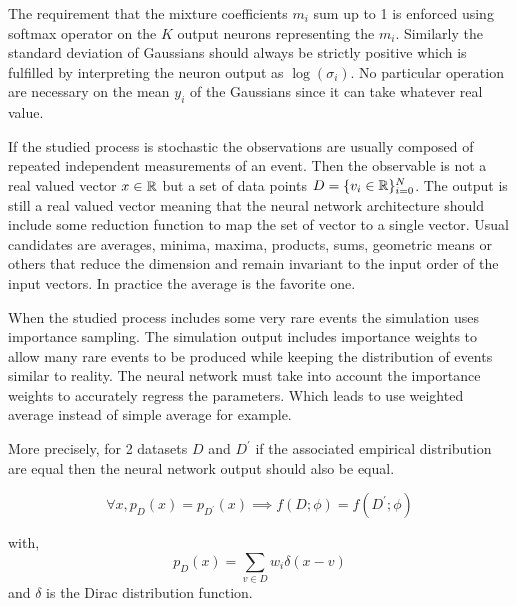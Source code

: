 The requirement that the mixture coefficients $m_i$ sum up to 1 is enforced using softmax operator on the $K$ output neurons representing the $m_i$.
Similarly the standard deviation of Gaussians should always be strictly positive which is fulfilled by interpreting the neuron output as $\log(\sigma_i)$.
No particular operation are necessary on the mean $y_i$ of the Gaussians since it can take whatever real value.

If the studied process is stochastic the observations are usually composed of repeated independent measurements of an event.
Then the observable is not a real valued vector $x \in \mathbb{R}$ but a set of data points $D = \{v_i \in \mathbb{R} \}_{i=0}^N$.
The output is still a real valued vector meaning that the neural network architecture should include some reduction function to map the set of vector to a single vector.
Usual candidates are averages, minima, maxima, products, sums, geometric means or others that reduce the dimension and remain invariant to the input order of the input vectors.
In practice the average is the favorite one.

When the studied process includes some very rare events the simulation uses importance sampling. 
The simulation output includes importance weights to allow many rare events to be produced while keeping the distribution of events similar to reality.
The neural network must take into account the importance weights to accurately regress the parameters.
Which leads to use weighted average instead of simple average for example.

More precisely, for 2 datasets $D$ and $D^\prime$ if the associated empirical distribution are equal then the neural network output should also be equal.

\begin{equation}
    \forall x, p_D(x) = p_{D^\prime}(x) \implies f(D; \phi) = f(D^\prime; \phi)
\end{equation}

with,
\begin{equation}
    p_D(x) = \sum_{v \in D} w_i \delta (x - v)
\end{equation}
and $\delta$ is the Dirac distribution function.



